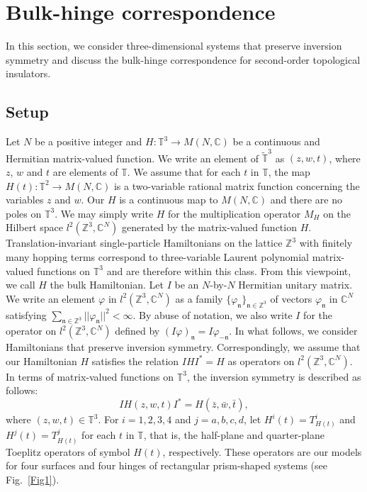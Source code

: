 \documentclass{amsart}
\theoremstyle{plain}
\theoremstyle{definition}
\theoremstyle{remark}
\newcommand{\Z}{\mathbb{Z}}
\newcommand{\C}{\mathbb{C}}
\newcommand{\T}{\mathbb{T}}
\newcommand{\tT}{\widetilde{\T}}
\begin{document}
\section{Bulk-hinge correspondence}
\label{Sect3}
In this section, we consider three-dimensional systems that preserve inversion symmetry and discuss the bulk-hinge correspondence for second-order topological insulators.

\subsection{Setup}
\label{Sect3.1}
Let $N$ be a positive integer
and $H \colon \T^3 \to M(N,\C)$ be a continuous and Hermitian matrix-valued function.
We write an element of $\tT^3$ as $(z,w,t)$, where $z$, $w$ and $t$ are elements of $\T$.
We assume that for each $t$ in $\T$, the map $H(t) \colon \T^2 \to M(N,\C)$ is a two-variable rational matrix function concerning the variables $z$ and $w$.
Our $H$ is a continuous map to $M(N, \C)$ and there are no poles on $\T^3$.
We may simply write $H$ for the multiplication operator $M_H$ on the Hilbert space $l^2(\Z^3, \C^N)$ generated by the matrix-valued function $H$.
Translation-invariant single-particle Hamiltonians on the lattice $\Z^3$ with finitely many hopping terms correspond to three-variable Laurent polynomial matrix-valued functions on $\T^3$ and are therefore within this class.
From this viewpoint, we call $H$ the bulk Hamiltonian.
Let $I$ be an $N$-by-$N$ Hermitian unitary matrix.
We write an element $\varphi$ in $l^2(\Z^3, \C^N)$ as a family $\{ \varphi_\mathfrak{n} \}_{\mathfrak{n} \in \Z^3}$ of vectors $\varphi_{\mathfrak{n}}$ in $\C^N$ satisfying $\sum_{\mathfrak{n} \in \Z^3}||\varphi_{\mathfrak{n}}||^2 < \infty$.
By abuse of notation, we also write $I$ for the operator on $l^2(\Z^3, \C^N)$ defined by $(I \varphi)_{\mathfrak{n}} = I \varphi_{-\mathfrak{n}}$.
In what follows, we consider Hamiltonians that preserve inversion symmetry.
Correspondingly, we assume that our Hamiltonian $H$ satisfies the relation $I H I^* = H$ as operators on $l^2(\Z^3, \C^N)$.
In terms of matrix-valued functions on $\T^3$, the inversion symmetry is described as follows:
\begin{equation}
\label{inversionHam}
	I H(z, w, t) I^* = H(\bar{z}, \bar{w}, \bar{t}),
\end{equation}
where $(z,w,t) \in \T^3$.
For $i=1,2,3,4$ and $j=a,b,c,d$, let $H^i(t) = T^i_{H(t)}$ and $H^j(t) = T^j_{H(t)}$ for each $t$ in $\T$, that is, the half-plane and quarter-plane Toeplitz operators of symbol $H(t)$, respectively.
These operators are our models for four surfaces and four hinges of rectangular prism-shaped systems (see Fig.~\ref{Fig1}).
\end{document}
